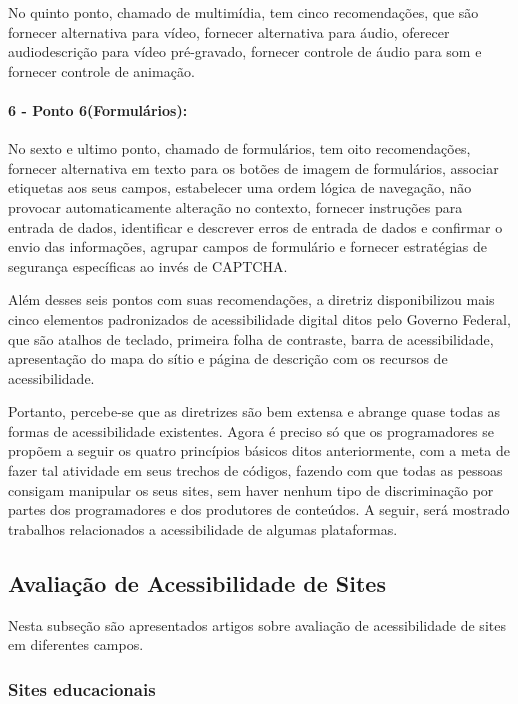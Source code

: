 \documentclass[a4paper]{article}
\begin{document}
\begin{titlepage}
No quinto ponto, chamado de multimídia, tem cinco recomendações, que são fornecer alternativa para vídeo, fornecer alternativa para áudio, oferecer audiodescrição para vídeo pré-gravado, fornecer controle de áudio para som e fornecer controle de animação.

\paragraph{6 - Ponto 6(Formulários): }

No sexto e ultimo ponto, chamado de formulários, tem oito recomendações, fornecer alternativa em texto para os botões de imagem de formulários, associar etiquetas aos seus campos, estabelecer uma ordem lógica de navegação, não provocar automaticamente alteração no contexto, fornecer instruções para entrada de dados, identificar e descrever erros de entrada de dados e confirmar o envio das informações, agrupar campos de formulário e fornecer estratégias de segurança específicas ao invés de CAPTCHA.

Além desses seis pontos com suas recomendações, a diretriz disponibilizou mais cinco elementos padronizados de acessibilidade digital ditos pelo Governo Federal, que são atalhos de teclado, primeira folha de contraste, barra de acessibilidade, apresentação do mapa do sítio e página de descrição com os recursos de acessibilidade.

Portanto, percebe-se que as diretrizes são bem extensa e abrange quase todas as formas de acessibilidade existentes. Agora é preciso só que os programadores se propõem a seguir os quatro princípios básicos ditos anteriormente, com a meta de fazer tal atividade em seus trechos de códigos, fazendo com que todas as pessoas consigam manipular os seus sites, sem haver nenhum tipo de discriminação por partes dos programadores e dos produtores de conteúdos. A seguir, será mostrado trabalhos relacionados a acessibilidade de algumas plataformas.

\subsection{Avaliação de Acessibilidade de Sites}
Nesta subseção são apresentados artigos sobre avaliação de acessibilidade de sites em diferentes campos.

\subsubsection{Sites educacionais}


\end{titlepage}
\end{document}
